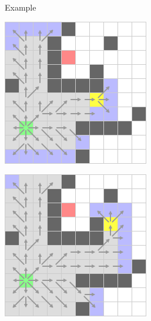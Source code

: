 \documentclass{presentation}
\begin{document}
\begin{frame}{Example}
\begin{minipage}{0.2\textwidth}
	\end{minipage}%
	\hspace{3cm}
	\begin{minipage}{0.2\textwidth}
		\includegraphics[width=\textwidth]{figures/A-Stern_geschnitten(241x241)/9.png}
	\end{minipage}%
	\hfill%
	\begin{minipage}{0.2\textwidth}
		\includegraphics[width=\textwidth]{figures/A-Stern_geschnitten(241x241)/10.png}

\end{minipage}
\end{frame}
\end{document}

